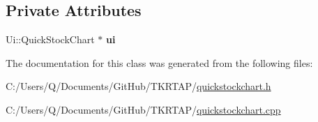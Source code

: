 \subsection*{Private Attributes}
\begin{DoxyCompactItemize}
\item 
\hypertarget{class_quick_stock_chart_aff762155d7d6c38f87c0fd0ff6733842}{Ui\+::\+Quick\+Stock\+Chart $\ast$ {\bfseries ui}}\label{class_quick_stock_chart_aff762155d7d6c38f87c0fd0ff6733842}

\end{DoxyCompactItemize}


The documentation for this class was generated from the following files\+:\begin{DoxyCompactItemize}
\item 
C\+:/\+Users/\+Q/\+Documents/\+Git\+Hub/\+T\+K\+R\+T\+A\+P/\hyperlink{quickstockchart_8h}{quickstockchart.\+h}\item 
C\+:/\+Users/\+Q/\+Documents/\+Git\+Hub/\+T\+K\+R\+T\+A\+P/\hyperlink{quickstockchart_8cpp}{quickstockchart.\+cpp}\end{DoxyCompactItemize}
